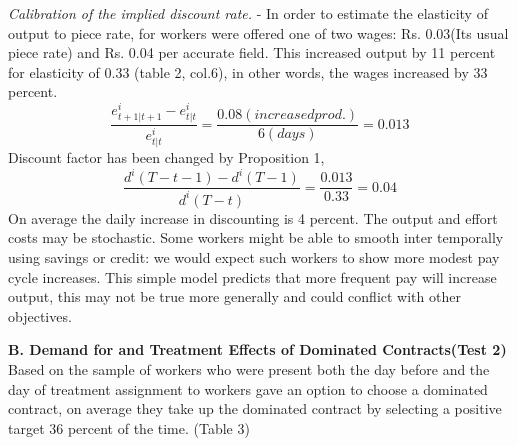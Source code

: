 \documentclass[a4paper,12pt]{article}
\begin{document}
\textit{Calibration of the implied discount rate.} - In order to estimate the elasticity of output to piece rate, for workers were offered one of two wages: Rs. 0.03(Its usual piece rate) and Rs. 0.04 per accurate field. This increased output by 11 percent for elasticity of 0.33 (table 2, col.6), in other words, the wages increased by 33 percent. 
\begin{equation}
 \frac{e_{t+1 \vert t+1}^i-e_{t \vert t}^i}{e_{t \vert t}^i}= \frac{0.08(increased prod.)}{6(days)}=0.013
\end{equation}
Discount factor has been changed by Proposition 1, 
\begin{equation}
  \frac{d^i (T-t-1)-d^i(T-1)}{d^i(T-t)}= \frac{0.013}{0.33}= 0.04
\end{equation}
On average the daily increase in discounting is 4 percent. The output and effort costs may be stochastic. Some workers might be able to smooth inter temporally using savings or credit: we would expect such workers to show more modest pay cycle increases. This simple model predicts that more frequent pay will increase output, this may not be true more generally and could conflict with other objectives. 


\textbf{B. Demand for and Treatment Effects of Dominated Contracts(Test 2)}
Based on the sample of workers who were present both the day before and the day of treatment assignment to workers gave an option to choose a dominated contract, on average they take up the dominated contract by selecting a positive target 36 percent of the time. (Table 3) 
\end{document}

